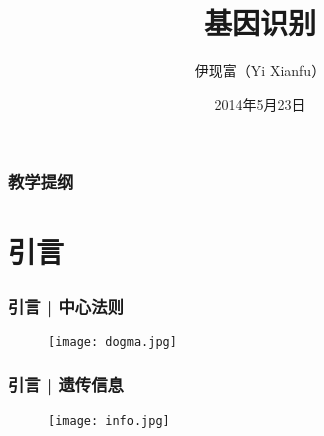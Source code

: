 \documentclass[table]{beamer}
\begin{document}

\title[基因识别]{基因识别}
\author[Yixf]{伊现富（Yi Xianfu）}
\date{2014年5月23日}



\begin{frame}
  \titlepage
\end{frame}

\begin{frame}[plain]
  \frametitle{教学提纲}
  \setcounter{tocdepth}{2}
  \begin{multicols}{2}
  \tableofcontents
  \end{multicols}
\end{frame}

\section{引言}
\begin{frame}
  \frametitle{引言 | 中心法则}
  \begin{figure}
    \centering
    \texttt{[image: dogma.jpg]}
  \end{figure}
\end{frame}

\begin{frame}
  \frametitle{引言 | 遗传信息}
  \begin{figure}
    \centering
    \texttt{[image: info.jpg]}
  \end{figure}
\end{frame}
\end{document}
